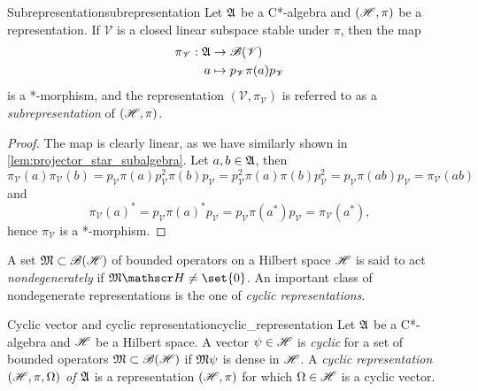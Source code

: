 \begin{proposition}{Subrepresentation}{subrepresentation}
    Let \(\mathfrak{A}\) be a C*-algebra and \((\mathscr{H}, \pi)\) be a representation. If \(\mathscr{V}\) is a closed linear subspace stable under \(\pi\), then the map
    \begin{align*}
        \pi_{\mathscr{V}} : \mathfrak{A} &\to \mathscr{B}(\mathscr{V})\\
                                      a &\mapsto p_\mathscr{V} \pi(a) p_{\mathscr{V}}
    \end{align*}
    is a *-morphism, and the representation \((\mathscr{V}, \pi_{\mathscr{V}})\) is referred to as a \emph{subrepresentation} of \((\mathscr{H}, \pi)\).
\end{proposition}
\begin{proof}
    The map is clearly linear, as we have similarly shown in \cref{lem:projector_star_subalgebra}. Let \(a, b \in \mathfrak{A}\), then
    \begin{equation*}
        \pi_{\mathscr{V}}(a)\pi_{\mathscr{V}}(b) = p_{\mathscr{V}} \pi(a) p_{\mathscr{V}}^2 \pi(b) p_{\mathscr{V}} = p_{\mathscr{V}}^2 \pi(a)\pi(b) p_{\mathscr{V}}^2 = p_{\mathscr{V}} \pi(ab) p_\mathscr{V} = \pi_{\mathscr{V}}(ab)
    \end{equation*}
    and
    \begin{equation*}
        \pi_{\mathscr{V}}(a)^* = p_{\mathscr{V}} \pi(a)^* p_{\mathscr{V}} = p_{\mathscr{V}}\pi(a^*) p_{\mathscr{V}} = \pi_{\mathscr{V}}(a^*),
    \end{equation*}
    hence \(\pi_\mathscr{V}\) is a *-morphism.
\end{proof}


A set \(\mathfrak{M}\subset \mathscr{B}(\mathscr{H})\) of bounded operators on a Hilbert space \(\mathscr{H}\) is said to act \emph{nondegenerately} if \(\algebra{M}\hilbert \neq \set{0}\). An important class of nondegenerate representations is the one of \emph{cyclic representations}.
\begin{definition}{Cyclic vector and cyclic representation}{cyclic_representation}
    Let \(\mathfrak{A}\) be a C*-algebra and \(\mathscr{H}\) be a Hilbert space. A vector \(\psi \in \mathscr{H}\) is \emph{cyclic} for a set of bounded operators \(\mathfrak{M} \subset \mathscr{B}(\mathscr{H})\) if \(\mathfrak{M}\psi\) is dense in \(\mathscr{H}\). A \emph{cyclic representation \((\mathscr{H}, \pi, \Omega)\) of \(\mathfrak{A}\)} is a representation \((\mathscr{H}, \pi)\) for which \(\Omega \in \mathscr{H}\) is a cyclic vector.
\end{definition}

